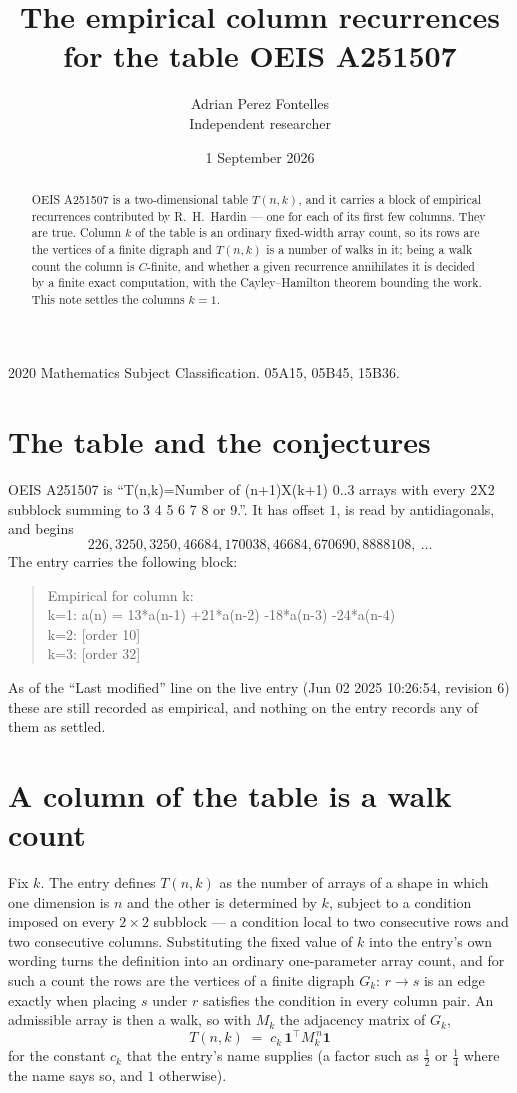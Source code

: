 \documentclass[11pt,a4paper]{article}
\title{The empirical column recurrences for the table OEIS A251507}
\author{Adrian Perez Fontelles\\ \small Independent researcher}
\date{1 September 2026}
\theoremstyle{plain}
\theoremstyle{definition}
\begin{document}
\maketitle

\begin{abstract}
OEIS A251507 is a two-dimensional table $T(n,k)$, and it carries a block of empirical
recurrences contributed by R.~H.~Hardin --- one for each of its first few columns. They are
true. Column $k$ of the table is an ordinary fixed-width array count, so its rows are the
vertices of a finite digraph and $T(n,k)$ is a number of walks in it; being a walk count the
column is $C$-finite, and whether a given recurrence annihilates it is decided by a finite
exact computation, with the Cayley--Hamilton theorem bounding the work. This note settles the
columns $k=1$.
\end{abstract}

\noindent\small 2020 Mathematics Subject Classification. 05A15, 05B45, 15B36.\normalsize

\section{The table and the conjectures}

OEIS A251507 is ``T(n,k)=Number of (n+1)X(k+1) 0..3 arrays with every 2X2 subblock summing to 3 4 5 6 7 8 or 9.''. It has offset $1$, is
read by antidiagonals, and begins
\[
226, 3250, 3250, 46684, 170038, 46684, 670690, 8888108,\ \dots
\]
The entry carries the following block:
\begin{quote}\small
Empirical for column k:\\
k=1: a(n) = 13*a(n-1) +21*a(n-2) -18*a(n-3) -24*a(n-4)\\
k=2: [order 10]\\
k=3: [order 32]\\
\end{quote}
As of the ``Last modified'' line on the live entry (Jun 02 2025 10:26:54, revision 6) these are still
recorded as empirical, and nothing on the entry records any of them as settled.

\section{A column of the table is a walk count}

Fix $k$. The entry defines $T(n,k)$ as the number of arrays of a shape in which one dimension
is $n$ and the other is determined by $k$, subject to a condition imposed on every
$2\times2$ subblock --- a condition local to two consecutive rows and two consecutive columns.
Substituting the fixed value of $k$ into the entry's own wording turns the definition into an
ordinary one-parameter array count, and for such a count the rows are the vertices of a finite
digraph $G_k$: $r\to s$ is an edge exactly when placing $s$ under $r$ satisfies the condition
in every column pair. An admissible array is then a walk, so with $M_k$ the adjacency matrix
of $G_k$,
\[
T(n,k)\;=\;c_k\,\mathbf{1}^{\!\top}M_k^{\,n}\mathbf{1}
\]
for the constant $c_k$ that the entry's name supplies (a factor such as $\tfrac12$ or
$\tfrac14$ where the name says so, and $1$ otherwise).
\end{document}
